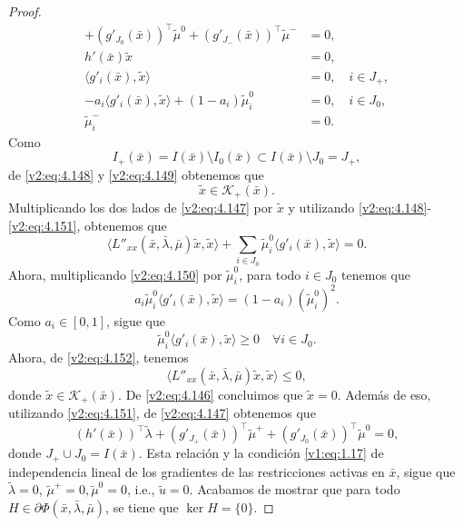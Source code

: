 \begin{proof}
\begin{align}
        + (g'_{J_0}(\bar{x}))^\top \tilde{\mu}^0 + (g'_{J_-}(\bar{x}))^\top \tilde{\mu}^- &= 0, \label{v2:eq:4.147} \\
        h'(\bar{x})\tilde{x} &= 0, \label{v2:eq:4.148} \\
        \langle g'_i(\bar{x}), \tilde{x} \rangle &= 0, \quad i \in J_+, \label{v2:eq:4.149} \\
        -a_i \langle g'_i(\bar{x}), \tilde{x} \rangle + (1 - a_i)\tilde{\mu}^0_i &= 0, \quad i \in J_0, \label{v2:eq:4.150} \\
        \tilde{\mu}^-_i &= 0. \label{v2:eq:4.151}
    \end{align}
    Como
    \[
        I_+(\bar{x}) = I(\bar{x}) \setminus I_0(\bar{x}) \subset I(\bar{x}) \setminus J_0 = J_+,
    \]
    de \eqref{v2:eq:4.148} y \eqref{v2:eq:4.149} obtenemos que
    \[
        \tilde{x} \in \mathcal{K}_+(\bar{x}).
    \]
    Multiplicando los dos lados de \eqref{v2:eq:4.147} por $\tilde{x}$ y utilizando \eqref{v2:eq:4.148}-\eqref{v2:eq:4.151}, obtenemos que
    \begin{equation}
        \langle L''_{xx}(\bar{x}, \bar{\lambda}, \bar{\mu})\tilde{x}, \tilde{x} \rangle + \sum_{i \in J_0} \tilde{\mu}^0_i \langle g'_i(\bar{x}), \tilde{x} \rangle = 0.
        \label{v2:eq:4.152}
    \end{equation}
    Ahora, multiplicando \eqref{v2:eq:4.150} por $\tilde{\mu}^0_i$, para todo $i \in J_0$ tenemos que
    \[
        a_i \tilde{\mu}^0_i \langle g'_i(\bar{x}), \tilde{x} \rangle = (1 - a_i)(\tilde{\mu}^0_i)^2.
    \]
    Como $a_i \in [0, 1]$, sigue que
    \[
        \tilde{\mu}^0_i \langle g'_i(\bar{x}), \tilde{x} \rangle \ge 0 \quad \forall i \in J_0.
    \]
    Ahora, de \eqref{v2:eq:4.152}, tenemos
    \[
        \langle L''_{xx}(\bar{x}, \bar{\lambda}, \bar{\mu})\tilde{x}, \tilde{x} \rangle \le 0,
    \]
    donde $\tilde{x} \in \mathcal{K}_+(\bar{x})$. De \eqref{v2:eq:4.146} concluimos que $\tilde{x} = 0$.
    Además de eso, utilizando \eqref{v2:eq:4.151}, de \eqref{v2:eq:4.147} obtenemos que
    \[
        (h'(\bar{x}))^\top \tilde{\lambda} + (g'_{J_+}(\bar{x}))^\top \tilde{\mu}^+ + (g'_{J_0}(\bar{x}))^\top \tilde{\mu}^0 = 0,
    \]
    donde $J_+ \cup J_0 = I(\bar{x})$.
    Esta relación y la condición \eqref{v1:eq:1.17} de independencia lineal de los gradientes de las restricciones activas en $\bar{x}$, sigue que $\tilde{\lambda} = 0$, $\tilde{\mu}^+ = 0, \tilde{\mu}^0 = 0$, i.e., $\tilde{u} = 0$.
    Acabamos de mostrar que para todo $H \in \partial \Phi(\bar{x}, \bar{\lambda}, \bar{\mu})$, se tiene que $\ker H = \{0\}$.
\end{proof}

